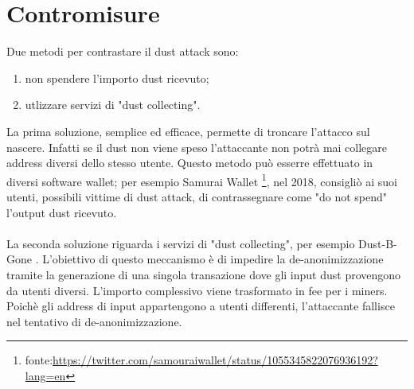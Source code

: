 \section{Contromisure}
Due metodi per contrastare il dust attack sono:
    \begin{enumerate}
        \item non spendere l'importo dust ricevuto; 
        \item utlizzare servizi di "dust collecting". 
    \end{enumerate}
La prima soluzione, semplice ed efficace, permette di troncare l'attacco sul nascere. Infatti se il dust non viene speso l'attaccante non potrà mai collegare address diversi dello stesso utente. 
Questo metodo può esserre effettuato in diversi software wallet; per esempio Samurai Wallet \footnote{fonte:\url{https://twitter.com/samouraiwallet/status/1055345822076936192?lang=en}}, nel 2018, consigliò ai suoi utenti, possibili vittime di dust attack,  di contrassegnare come "do not spend" l'output dust ricevuto.\\\\
La seconda soluzione riguarda i servizi di "dust collecting", per esempio Dust-B-Gone \cite{Dbg}.
L'obiettivo di questo meccanismo è di impedire la de-anonimizzazione tramite la generazione di una singola transazione dove gli input dust provengono da utenti diversi. L'importo complessivo viene trasformato in fee per i miners. \\Poichè gli address di input appartengono a utenti differenti, l'attaccante fallisce nel tentativo di de-anonimizzazione.